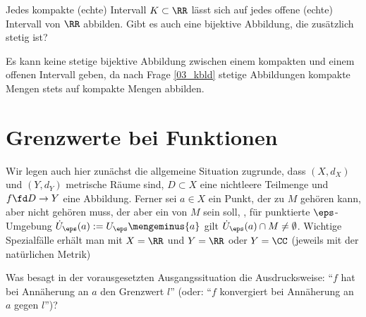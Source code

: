 \begin{frage}\label{03_stbj}
  Jedes kompakte (echte) Intervall $K\subset \RR$ lässt sich 
   auf jedes offene (echte) Intervall von $\RR$ abbilden. 
  Gibt es auch eine bijektive Abbildung, die zusätzlich stetig ist?
\end{frage}

\begin{antwort}
  Es kann keine stetige bijektive Abbildung 
  zwischen einem kompakten und einem offenen Intervall 
  geben, da nach Frage \ref{03_kbld} 
  stetige Abbildungen kompakte Mengen stets auf 
  kompakte Mengen abbilden.  \AntEnd
\end{antwort} 

\section{Grenzwerte bei Funktionen}

Wir legen auch hier zunächst die allgemeine Situation zugrunde, dass 
$(X,d_X)$ und $(Y,d_Y)$ metrische Räume sind, $D\subset X$ eine nichtleere 
Teilmenge und $f\fd D\to Y$ eine Abbildung. 
Ferner sei $a\in X$ ein Punkt, der zu $M$ gehören kann, aber nicht gehören 
muss, der aber ein  von $M$ sein soll, {\dasheisst},   
für  punktierte $\eps$-Umgebung 
$\dot{U}_\eps (a) := U_\eps\mengeminus\{a\}$ gilt 
$\dot{U}_\eps(a) \cap M \not= \emptyset$. 
Wichtige Spezialfälle erhält man mit $X=\RR$ und $Y=\RR$ oder $Y=\CC$ 
(jeweils mit der natürlichen Metrik)

\begin{frage}\label{03_fkon}
  Was besagt in der vorausgesetzten Ausgangssituation 
  die Ausdrucksweise: "`$f$ hat bei Annäherung an 
  $a$ den Grenzwert $l$"' (oder: "`$f$ konvergiert bei 
  Annäherung an $a$ gegen $l$"')? 
\end{frage}

